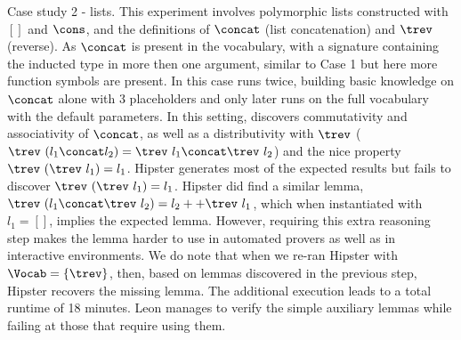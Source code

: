 \begin{myparagraph}{Case study 2 - lists.}
This experiment involves polymorphic lists constructed with $[]$ and $\cons$, and the definitions of $\concat$ (list concatenation) and $\trev$ (reverse).
As $\concat$ is present in the vocabulary, with a signature containing the inducted type in more then one argument, similar to Case 1 but here more function symbols are present. 
In this case \TheSy runs twice, building basic knowledge on $\concat$ alone with 3 placeholders and only later runs on the full vocabulary with the default parameters.
In this setting, \TheSy discovers commutativity and associativity of $\concat$, as well as a distributivity with $\trev$ ($\trev~(l_1 \concat l_2) = \trev~l_1 \concat \trev~l_2$) and the nice property $\trev~(\trev~l_1) = l_1$.
Hipster generates most of the expected results but fails to discover $\trev~(\trev~l_1) = l_1$.
Hipster did find a similar lemma, $\trev~(l_1 \concat \trev~l_2) = l_2 ++ \trev~l_1$, which when instantiated with $l_1=[]$, implies the expected lemma. However, requiring this extra reasoning step makes the lemma harder to use in automated provers as well as in interactive environments.
We do note that when we re-ran Hipster with $\Vocab=\{\trev\}$, then, based on lemmas discovered in the previous step, Hipster recovers the missing lemma.
The additional execution leads to a total runtime of 18 minutes.
Leon manages to verify the simple auxiliary lemmas while failing at those that require using them.
\end{myparagraph}


